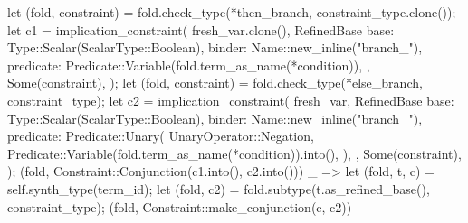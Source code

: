 \documentclass[
  oneside,
  english,
  coorientadorbanca,
  noabntexcite
]{ufsc-thesis-rn46-2019}
\begin{document}
\begin{rustcode}
{{{{                let (fold, constraint) = fold.check_type(*then_branch, constraint_type.clone());
                let c1 = implication_constraint(
                    fresh_var.clone(),
                    RefinedBase {
                        base: Type::Scalar(ScalarType::Boolean),
                        binder: Name::new_inline("branch_"),
                        predicate: Predicate::Variable(fold.term_as_name(*condition)),
                    },
                    Some(constraint),
                );
                let (fold, constraint) = fold.check_type(*else_branch, constraint_type);
                let c2 = implication_constraint(
                    fresh_var,
                    RefinedBase {
                        base: Type::Scalar(ScalarType::Boolean),
                        binder: Name::new_inline("branch_"),
                        predicate: Predicate::Unary(
                            UnaryOperator::Negation,
                            Predicate::Variable(fold.term_as_name(*condition)).into(),
                        ),
                    },
                    Some(constraint),
                );
                (fold, Constraint::Conjunction(c1.into(), c2.into()))
            }
            _ => {
                let (fold, t, c) = self.synth_type(term_id);
                let (fold, c2) = fold.subtype(t.as_refined_base(), constraint_type);
                (fold, Constraint::make_conjunction(c, c2))
            }
        }
    }

}
\end{rustcode}
\end{document}
